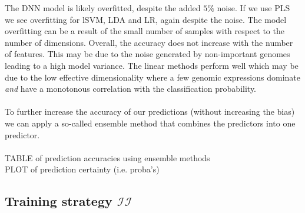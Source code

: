 \documentclass[a4paper,10pt]{article}
\begin{document}
%
The DNN model is likely overfitted, despite the added $5\%$ noise. If we use PLS we see overfitting for lSVM, LDA and LR, again despite the noise.
The model overfitting can be a result of the small number of samples with respect to the number of dimensions. Overall, the accuracy does not increase 
with the number of features. This may be due to the noise generated by non-important genomes leading to a high model variance. The linear methods perform well
which may be due to the low effective dimensionality where a few genomic expressions dominate \textit{and} have a monotonous correlation with the classification probability. \\ \\
%
To further increase the accuracy of our predictions (without increasing the bias) we can apply a so-called ensemble method that combines the predictors
into one predictor. \\ \\
%
TABLE of prediction accuracies using ensemble methods  \\ %
PLOT of prediction certainty (i.e. proba's)
%
\subsection{Training strategy $\mathcal{II}$}

\end{document}
